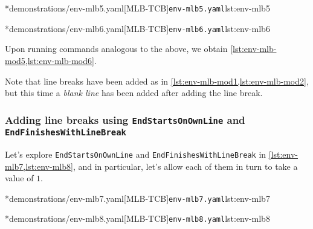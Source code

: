 	\begin{minipage}{.45\textwidth}
		\cmhlistingsfromfile[style=yaml-LST]*{demonstrations/env-mlb5.yaml}[MLB-TCB]{\texttt{env-mlb5.yaml}}{lst:env-mlb5}
	\end{minipage}
	\hfill
	\begin{minipage}{.45\textwidth}
		\cmhlistingsfromfile[style=yaml-LST]*{demonstrations/env-mlb6.yaml}[MLB-TCB]{\texttt{env-mlb6.yaml}}{lst:env-mlb6}
	\end{minipage}

	Upon running  commands analogous to the above, we obtain \cref{lst:env-mlb-mod5,lst:env-mlb-mod6}.

	\begin{widepage}
		\begin{minipage}{.56\linewidth}
		\end{minipage}
		\hfill
		\begin{minipage}{.43\linewidth}
		\end{minipage}
	\end{widepage}

	Note that line breaks have been added as in \cref{lst:env-mlb-mod1,lst:env-mlb-mod2}, but this time a \emph{blank line} has been added after adding the line break.

\subsubsection[Adding line breaks: \texttt{EndStartsOnOwnLine} and \texttt{EndFinishesWithLineBreak}]{Adding line breaks using \texttt{EndStartsOnOwnLine} and \texttt{EndFinishesWithLineBreak}}
	Let's explore \texttt{EndStartsOnOwnLine} and \texttt{EndFinishesWithLineBreak} in \cref{lst:env-mlb7,lst:env-mlb8}, and in particular, let's allow each of them in turn to take a value of $1$.

	\begin{minipage}{.49\textwidth}
		\cmhlistingsfromfile[style=yaml-LST]*{demonstrations/env-mlb7.yaml}[MLB-TCB]{\texttt{env-mlb7.yaml}}{lst:env-mlb7}
	\end{minipage}
	\hfill
	\begin{minipage}{.49\textwidth}
		\cmhlistingsfromfile[style=yaml-LST]*{demonstrations/env-mlb8.yaml}[MLB-TCB]{\texttt{env-mlb8.yaml}}{lst:env-mlb8}
	\end{minipage}

